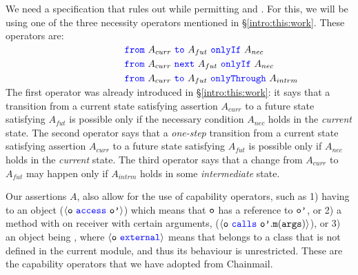 {We need  a specification that rules out \ModB while permitting \ModA and
\ModC.  For this, we will be using  one of the  three necessity operators mentioned in  \S \ref{intro:this:work}. These operators are:}
\\
$ \strut \hspace{1.7in} {\color{blue}\texttt{from}}\ A_{curr}\ {\color{blue}\texttt{to}}\ A_{fut}\ {\color{blue}\texttt{onlyIf}}\ A_{nec} $ \\
$ \strut \hspace{1.7in}   {\color{blue}\texttt{from}}\ A_{curr}\ {\color{blue}\texttt{next}}\ A_{fut}\ {\color{blue}\texttt{onlyIf}}\ A_{nec} $ \\
$ \strut \hspace{1.7in}   {\color{blue}\texttt{from}}\ A_{curr}\ {\color{blue}\texttt{to}}\ A_{fut}\ {\color{blue}\texttt{onlyThrough}}\ A_{intrm} $
\\
The first operator was already introduced in \S \ref{intro:this:work}: it says that  
a  {transition} from a current state satisfying assertion $A_{curr}$ to a future
state satisfying $A_{fut}$  is possible only if  the   necessary 
condition
$A_{nec}$ holds in the \emph{current} state.
%
{The  second operator says    that 
a  \emph{one-step} {transition} from a current state satisfying assertion $A_{curr}$ to a future
state satisfying $A_{fut}$  
is possible only if %
$A_{nec}$ holds in the \emph{current} state.   
The   third operator   says that a change from %
 $A_{curr}$ to  $A_{fut}$  may happen only if %
 $A_{intrm}$ holds in some \emph{intermediate} state.}
 
  
%  

{
Our assertions $A$, also allow for the use of capability operators, such as 
1) having  to an object ($\langle {\texttt{o}}\ {\color{blue}\texttt{access}}\ {\texttt{o'}} \rangle$) which means that ${\texttt{o}}$ has a reference to ${\texttt{o'}}$,
 or 2)  a method with on receiver with certain arguments, 
  ($\langle {\texttt{o}}\ {\color{blue}\texttt{calls}}\ {\texttt{o'}}.{\texttt{m}}({\texttt{args}}) \rangle $), or 3) an object being ,
  where  $\langle {\texttt{o}}\ {\color{blue}\texttt{external}}\rangle$ means that  belongs to a class that is not defined in the current module,
  and thus its behaviour is unrestricted.}
 These are the capability operators that we have 
adopted from Chainmail.



